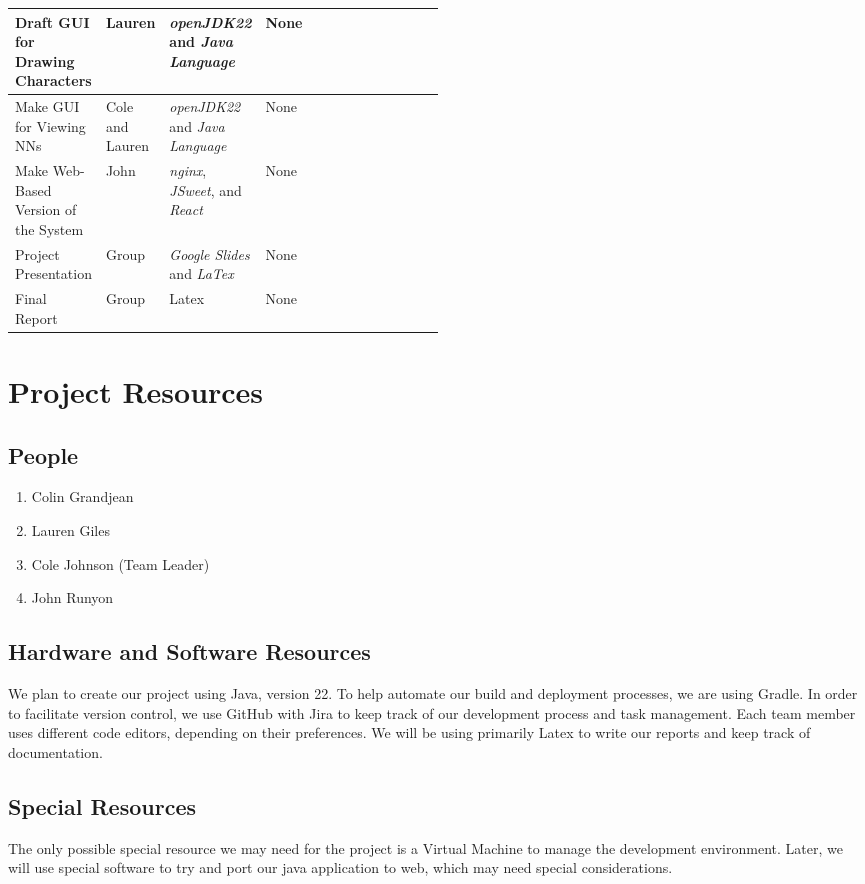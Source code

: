 \documentclass[english,12pt]{article}
\begin{document}
\begin{longtable}{|P{0.20\linewidth}|P{0.10\linewidth}|P{0.2\linewidth}|P{0.5cm}|}
  Draft GUI for Drawing Characters & Lauren & \textit{openJDK22} and \textit{Java Language}  & None\\
  \hline

  Make GUI for Viewing NNs & Cole and Lauren & \textit{openJDK22} and \textit{Java Language}  & None\\
  \hline

  Make Web-Based Version of the System & John & \textit{nginx}, \textit{JSweet}, and \textit{React} & None\\
  \hline

  Project Presentation & Group & \textit{Google Slides} and \textit{LaTex} & None \\
  \hline

  Final Report & Group & Latex & None \\
  \hline
\end{longtable}
\pagebreak
\section{Project Resources}

\subsection{People}
\begin{enumerate}
  \item Colin Grandjean 
  \item Lauren Giles   
  \item Cole Johnson (Team Leader)
  \item John Runyon    
\end{enumerate}
\subsection{Hardware and Software Resources}
We plan to create our project using Java, version 22. 
To help automate our build and deployment processes, we are using Gradle. 
In order to facilitate version control, we use GitHub with Jira to keep track of our 
development process and task management. Each team member uses different 
code editors, depending on their preferences. We will be using primarily Latex to
write our reports and keep track of documentation.

\subsection{Special Resources}
The only possible special resource we may need for the project is a Virtual Machine 
to manage the development environment. Later, we will use
special software to try and port our java application to web, which may need
special considerations.
\end{document}
